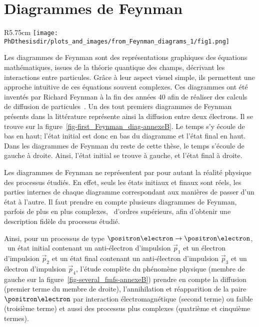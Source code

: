 \chapter{Diagrammes de Feynman}\label{annexe-fmf}
\begin{wrapfigure}{R}{5.75cm}
\centering
\texttt{[image: \\PhDthesisdir/plots\_and\_images/from\_Feynman\_diagrams\_1/fig1.png]}
\caption[Diagramme de Feynman de la diffusion électron-électron.]{Diagramme de Feynman de la diffusion électron-électron présenté dans la référence~\cite{Feynman_diagrams_1}. Ici, le temps s'écoule vers le haut; l'état initial est donc en bas du diagramme et l'état final en haut.}
\label{fig-first_Feynman_diag-annexeB}
\end{wrapfigure}
Les diagrammes de Feynman sont des représentations graphiques des équations mathématiques, issues de la théorie quantique des champs, décrivant les interactions entre particules.
Grâce à leur aspect visuel simple, ils permettent une approche intuitive de ces équations souvent complexes.
Ces diagrammes ont été inventés par Richard Feynman à la fin des années 40 afin de réaliser des calculs de diffusion de particules~\cite{Feynman_diagrams_1}.
Un des tout premiers diagrammes de Feynman présents dans la littérature représente ainsi la diffusion entre deux électrons.
Il se trouve sur la figure~\ref{fig-first_Feynman_diag-annexeB}.
Le temps s'y écoule de bas en haut; l'état initial est donc en bas du diagramme et l'état final en haut.
Dans les diagrammes de Feynman du reste de cette thèse, le temps s'écoule de gauche à droite.
Ainsi, l'état initial se trouve à gauche, et l'état final à droite.
\par Les diagrammes de Feynman ne représentent par pour autant la réalité physique des processus étudiés.
En effet, seuls les états initiaux et finaux sont réels, les parties internes de chaque diagramme correspondant aux manières de passer d'un état à l'autre.
Il faut prendre en compte plusieurs diagrammes de Feynman, parfois de plus en plus complexes, \ie\ d'ordres supérieurs, afin d'obtenir une description fidèle du processus étudié.
\par Ainsi, pour un processus de type $\positron\electron\to\positron\electron$, \ie\
un état initial contenant
un anti-électron d'impulsion $\vec{p}_1$
et
un électron d'impulsion $\vec{p}_2$
et
un état final contenant
un anti-électron d'impulsion $\vec{p}_3$
et
un électron d'impulsion $\vec{p}_4$,
l'étude complète du phénomène physique (membre de gauche sur la figure~\ref{fig-several_fmfs-annexeB}) prendre en compte la diffusion (premier terme du membre de droite), l'annihilation et réapparition de la paire $\positron\electron$ par interaction électromagnétique (second terme) ou faible (troisième terme) et aussi des processus plus complexes (quatrième et cinquième termes).

